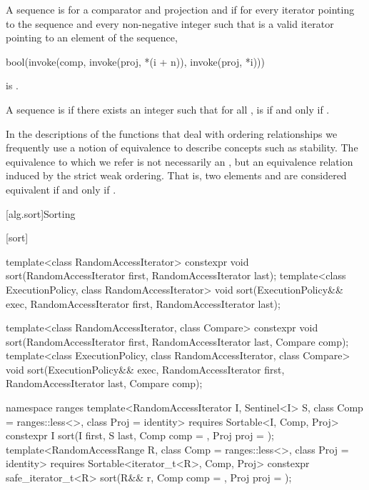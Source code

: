 \pnum
A sequence is 
for a comparator and projection  and 
if for every iterator  pointing to the sequence and
every non-negative integer 
such that  is a valid iterator
pointing to an element of the sequence,
\begin{codeblock}
bool(invoke(comp, invoke(proj, *(i + n)), invoke(proj, *i)))
\end{codeblock}
is .

\pnum
A sequence  is
 
if there exists an integer 
such that for all ,
 is  if and only if .

\pnum
In the descriptions of the functions that deal with ordering relationships
we frequently use a notion of equivalence to describe concepts
such as stability.
The equivalence to which we refer is not necessarily an ,
but an equivalence relation induced by the strict weak ordering.
That is, two elements  and  are considered equivalent
if and only if .

[alg.sort]{Sorting}

[sort]{}

%
\begin{itemdecl}
template<class RandomAccessIterator>
  constexpr void sort(RandomAccessIterator first, RandomAccessIterator last);
template<class ExecutionPolicy, class RandomAccessIterator>
  void sort(ExecutionPolicy&& exec,
            RandomAccessIterator first, RandomAccessIterator last);

template<class RandomAccessIterator, class Compare>
  constexpr void sort(RandomAccessIterator first, RandomAccessIterator last,
                      Compare comp);
template<class ExecutionPolicy, class RandomAccessIterator, class Compare>
  void sort(ExecutionPolicy&& exec,
            RandomAccessIterator first, RandomAccessIterator last,
            Compare comp);

namespace ranges {
  template<RandomAccessIterator I, Sentinel<I> S, class Comp = ranges::less<>,
           class Proj = identity>
    requires Sortable<I, Comp, Proj>
    constexpr I
      sort(I first, S last, Comp comp = {}, Proj proj = {});
  template<RandomAccessRange R, class Comp = ranges::less<>, class Proj = identity>
    requires Sortable<iterator_t<R>, Comp, Proj>
    constexpr safe_iterator_t<R>
      sort(R&& r, Comp comp = {}, Proj proj = {});
}
\end{itemdecl}

